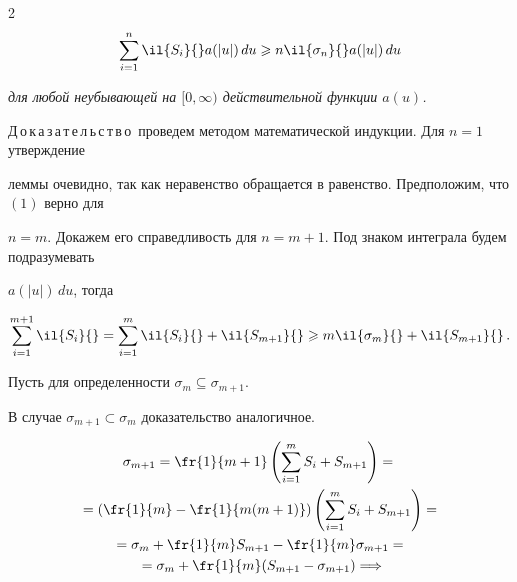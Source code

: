 \begin{multicols}{2}
\begin{equation}
\sumi \il{S_i}{} a(|u|)\,du \geqslant n \il{\sigma_n}{} a(|u|)\,du


\label{e1z}


\end{equation}


\textit{для любой неубывающей на $[0,\infty)$ действительной функции $a(u)$.}


\smallskip





\noindent


Д\,о\,к\,а\,з\,а\,т\,е\,л\,ь\,с\,т\,в\,о~проведем методом математической индукции. Для $n=1$ утверждение


леммы очевидно, так как неравенство обращается в равенство. Предположим, что $(1)$ верно для


$n=m$. Докажем его справедливость для $n=m+1$. Под знаком интеграла будем подразумевать


$a(|u|)\,du$, тогда


\begin{equation}


\suml{i=1}{m+1}\il{S_i}{} = \suml{i=1}{m} \il{S_i}{} + \il{S_{m+1}}{} \geqslant m


\il{\sigma_m}{} + \il{S_{m+1}}{} \,.


\label{e2z}


\end{equation}





Пусть для определенности $\sigma_m \subseteq \sigma_{m+1}$.


В случае $\sigma_{m+1} \subset


\sigma_m$ доказательство аналогичное.


\begin{multline*}


\sigma_{m+1}=\fr{1}{m+1} \left( \suml{i=1}{m}S_i + S_{m+1} \right) ={}\\


{}= \left(


\fr{1}{m}-\fr{1}{m(m+1)} \right) \left( \suml{i=1}{m}S_i + S_{m+1} \right)={}\\


{}=\sigma_m+\fr{1}{m}S_{m+1}-\fr{1}{m}\sigma_{m+1}={}\\


{}=


\sigma_m+\fr{1}{m}(S_{m+1}-\sigma_{m+1})


\Longrightarrow



\end{multline*}
\end{multicols}
